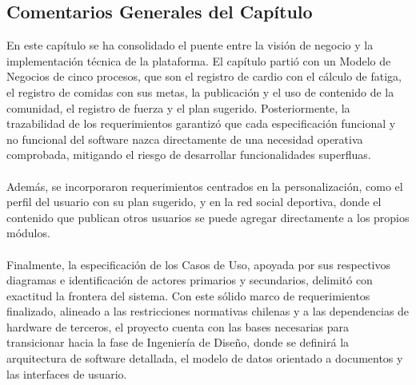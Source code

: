 \newpage
\subsection{Comentarios Generales del Capítulo}
En este capítulo se ha consolidado el puente entre la visión de negocio y la implementación técnica de la plataforma. El capítulo partió con un Modelo de Negocios de cinco procesos, que son el registro de cardio con el cálculo de fatiga, el registro de comidas con sus metas, la publicación y el uso de contenido de la comunidad, el registro de fuerza y el plan sugerido. Posteriormente, la trazabilidad de los requerimientos garantizó que cada especificación funcional y no funcional del software nazca directamente de una necesidad operativa comprobada, mitigando el riesgo de desarrollar funcionalidades superfluas. 
\\\\
Además, se incorporaron requerimientos centrados en la personalización, como el perfil del usuario con su plan sugerido, y en la red social deportiva, donde el contenido que publican otros usuarios se puede agregar directamente a los propios módulos.
\\\\
Finalmente, la especificación de los Casos de Uso, apoyada por sus respectivos diagramas e identificación de actores primarios y secundarios, delimitó con exactitud la frontera del sistema. Con este sólido marco de requerimientos finalizado, alineado a las restricciones normativas chilenas y a las dependencias de hardware de terceros, el proyecto cuenta con las bases necesarias para transicionar hacia la fase de Ingeniería de Diseño, donde se definirá la arquitectura de software detallada, el modelo de datos orientado a documentos y las interfaces de usuario.

